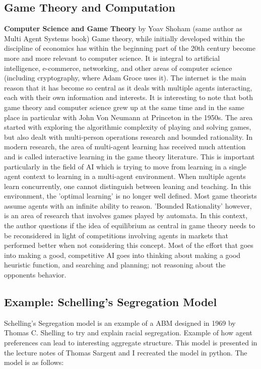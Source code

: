 \documentclass[12pt,twoside]{reedthesis}
\begin{document}
\subsection{Game Theory and Computation}
\textbf{Computer Science and Game Theory} by Yoav Shoham (same author as Multi Agent Systems book) Game theory, while initially developed within the discipline of economics has within the beginning part of the 20th century become more and more relevant to computer science. It is integral to artificial intelligence, e-commerce, networking, and other areas of computer science (including cryptography, where Adam Groce uses it). The internet is the main reason that it has become so central as it deals with multiple agents interacting, each with their own information and interests. It is interesting to note that both game theory and computer science grew up at the same time and in the same place in particular with John Von Neumann at Princeton in the 1950s. The area started with exploring the algorithmic complexity of playing and solving games, but also dealt with multi-person operations research and bounded rationality. In modern research, the area of multi-agent learning has received much attention and is called interactive learning in the game theory literature. This is important particularly in the field of AI which is trying to move from learning in a single agent context to learning in a multi-agent environment. When multiple agents learn concurrently, one cannot distinguish between leaning and teaching. In this environment, the 'optimal learning' is no longer well defined. Most game theorists assume agents with an infinite ability to reason. 'Bounded Rationality' however, is an area of research that involves games played by automata. In this context, the author questions if the idea of equilibrium as central in game theory needs to be reconsidered in light of competitions involving agents in markets that performed better when not considering this concept. Most of the effort that goes into making a good, competitive AI goes into thinking about making a good heuristic function, and searching and planning; not reasoning about the opponents behavior. \cite{Shoham2008a}


\subsection{Example: Schelling's Segregation Model}

Schelling's Segregation model is an example of a ABM designed in 1969 by Thomas C. Shelling to try and explain racial segregation. Example of how agent preferences can lead to interesting aggregate structure. This model is presented in the lecture notes of Thomas Sargent and I recreated the model in python. The model is as follows: \\
\end{document}
